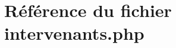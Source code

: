 \hypertarget{intervenants_8php}{
\section{R\'{e}f\'{e}rence du fichier intervenants.php}
\label{intervenants_8php}
}
